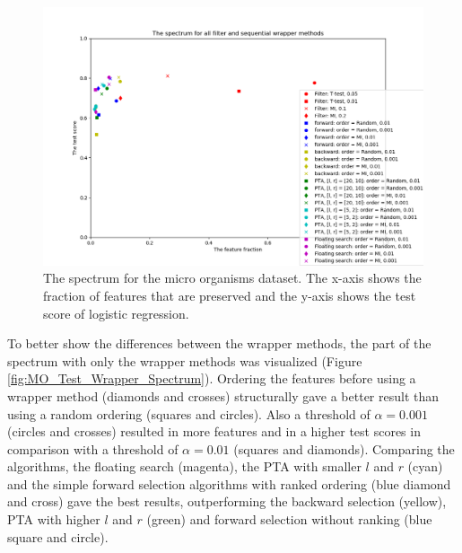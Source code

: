 \documentclass[10pt,a4paper]{article}
\begin{document}
	\begin{figure}[H]
		\includegraphics[width=1\textwidth]{MO_Test_Spectrum.png}
		\caption{The spectrum for the micro organisms dataset. The x-axis shows the fraction of features that are preserved and the y-axis shows the test score of logistic regression.}
		\label{fig:MO_Test_Spectrum}
	\end{figure}

	To better show the differences between the wrapper methods, the part of the spectrum with only the wrapper methods was visualized (Figure \ref{fig:MO_Test_Wrapper_Spectrum}). Ordering the features before using a wrapper method (diamonds and crosses) structurally gave a better result than using a random ordering (squares and circles). Also a threshold of $\alpha = 0.001$ (circles and crosses) resulted in more features and in a higher test scores in comparison with a threshold of $\alpha = 0.01$ (squares and diamonds). Comparing the algorithms, the floating search (magenta), the PTA with smaller $l$ and $r$ (cyan) and the simple forward selection algorithms with ranked ordering (blue diamond and cross) gave the best results, outperforming the backward selection (yellow), PTA with higher $l$ and $r$ (green) and forward selection without ranking (blue square and circle).
	
\end{document}
